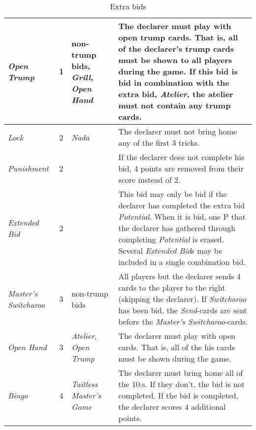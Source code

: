 \begin{table}
\begin{center}
{\begin{tabularx}{\textwidth}{ lcX | p{6cm} }
					\textit{Open Trump} & 1 &
					non-trump bids, \newline \textit{Grill}, \newline \textit{Open Hand} &
					The declarer must play with open trump cards. That is, all of the declarer’s trump cards must be shown to all players during the game. If this bid is bid in combination with the extra bid, \emph{Atelier}, the atelier must not contain any trump cards.
					\\ \hline
					
					\textit{Lock} & 2 &
					\textit{Nada} &
					The declarer must not bring home any of the first 3 tricks.
					\\ \hline
					
					\textit{Punishment} & 2 &
					&
					If the declarer does not complete his bid, 4 points are removed from their score instead of 2.
					\\ \hline
					
					\textit{Extended Bid} & 2 &
					&
					This bid may only be bid if the declarer has completed the extra bid \emph{Potential}. When it is bid, one P that the declarer has gathered through completing \emph{Potential} is erased. Several \emph{Extended Bid}s may be included in a single combination bid.
					\\ \hline
					
					\textit{Master's Switcharoo} & 3 &
					non-trump bids &
					All players but the declarer sends 4 cards to the player to the right (skipping the declarer). If \emph{Switcharoo} has been bid, the \emph{Send}-cards are sent before the \emph{Master's Switcharoo}-cards.
					\\ \hline
					
					\textit{Open Hand} & 3 &
					\textit{Atelier}, \newline \textit{Open Trump} &
					The declarer must play with open cards. That is, all of the his cards must be shown during the game.
					\\ \hline
					
					\textit{Bingo} & 4 &
					\textit{Taitless Master's Game} &
					The declarer must bring home all of the 10:s. If they don't, the bid is not completed. If the bid is completed, the declarer scores 4 additional points.
					
			\end{tabularx}
		}
	\end{center}
	\caption{Extra bids}
	\label{tab:extraBids}
\end{table}
